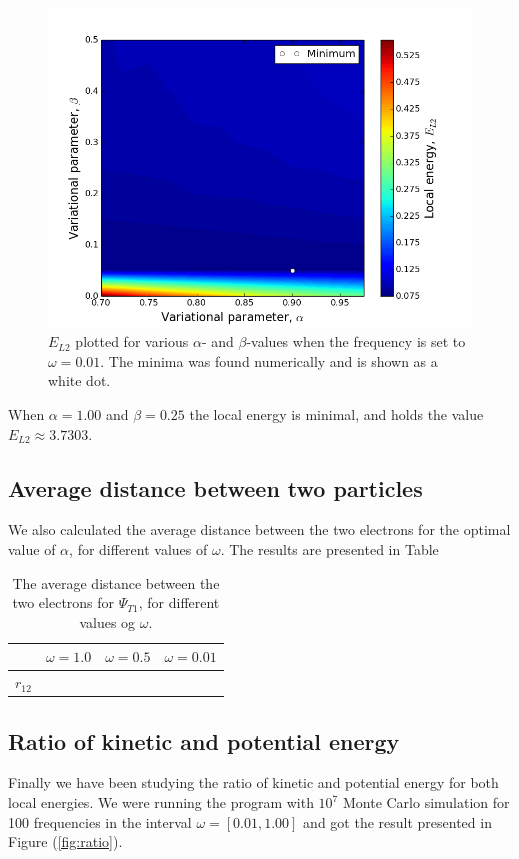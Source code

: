 \documentclass[norsk,a4paper,12pt]{article}
\begin{document}
\begin{figure} [H]
    \centering
    \includegraphics[width=12cm]{E_L2_contour_omega=0_01.png}
    \caption{$E_{L2}$ plotted for various $\alpha$- and $\beta$-values when the frequency is set to $\omega=0.01$. The minima was found numerically and is shown as a white dot.}
    \label{fig:E_L2_omega=0_01}
\end{figure}
When $\alpha=1.00$ and $\beta=0.25$ the local energy is minimal, and holds the value $E_{L2}\approx3.7303$.

\subsection{Average distance between two particles}
We also calculated the average distance between the two electrons for the optimal value of $\alpha$, for different values of $\omega$. The results are presented in Table 

\begin{table} [H]
\centering
\caption{The average distance between the two electrons for $\Psi_{T1}$, for different values og $\omega$.}

\begin{tabularx}{\textwidth}{XXXX} \hline
\label{2x2Lattice_Microstates}
{\bf } & {\bf $\omega = 1.0$ } & {\bf $ \omega = 0.5 $ } & {\bf $\omega = 0.01$} \\ \hline
{$r_{12}$} & & &\\ \hline 
\end{tabularx}
\end{table}

\subsection{Ratio of kinetic and potential energy}
Finally we have been studying the ratio of kinetic and potential energy for both local energies. We were running the program with $10^7$ Monte Carlo simulation for 100 frequencies in the interval $\omega=[0.01,1.00]$ and got the result presented in Figure (\ref{fig:ratio}).
\end{document}

